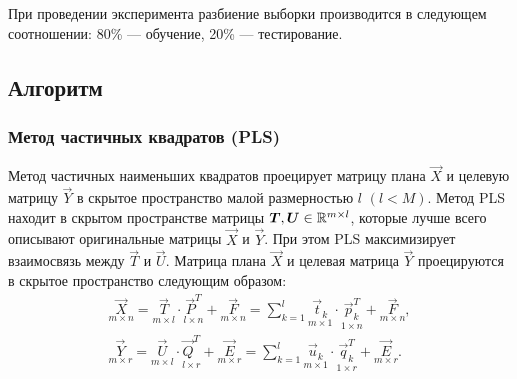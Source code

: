 \documentclass[12pt, twoside]{article}
\begin{document}
При проведении эксперимента разбиение выборки производится в следующем соотношении: 80\% --- обучение, 20\% --- тестирование.

\subsection{Алгоритм}


\subsubsection{Метод частичных квадратов (PLS)}

Метод частичных наименьших квадратов проецирует матрицу плана $\vec{X}$ и целевую
 матрицу $\vec{Y}$ в скрытое пространство малой размерностью $l$ $(l < M)$. Метод PLS находит в скрытом пространстве матрицы $\vec{T}, \vec{U} \in \RR
^{m\times l}$, которые лучше всего описывают оригинальные матрицы $\vec{X}$ и $\vec{Y}$. При этом PLS максимизирует взаимосвязь между $\vec{T}$ и $\vec{U}$.
Матрица плана $\vec{X}$ и целевая матрица $\vec{Y}$ проецируются в скрытое пространство следующим образом:
\begin{equation*}
\begin{split}
\underset{m\times n
}{\vec{X}}= \underset{m\times l}{\vec{T}} \cdot \underset{l\times n
}{\vec{P}^T}
+ \underset{m\times n}{\vec{F}}
=
\sum_{k=1}^{l}
\underset{m\times 1}{\vec{t}_k}
\cdot\underset{1\times n}{\vec{p}^T_k}
+ \underset{m\times n}{\vec{F}}
, 
\\ 
\underset{m\times r}{\vec{Y}}
= \underset{m\times l}{\vec{U}} \cdot \underset{l\times r
}{\vec{Q}^T}
+ \underset{m\times r
}{\vec{E}}= \sum_{k=1}^l
\underset{m\times 1}{\vec{u}_k} \cdot \underset{1\times r}{\vec{q}^T_k}
+ \underset{m\times r}{\vec{E}}.
\end{split}
\end{equation*}
\end{document}

